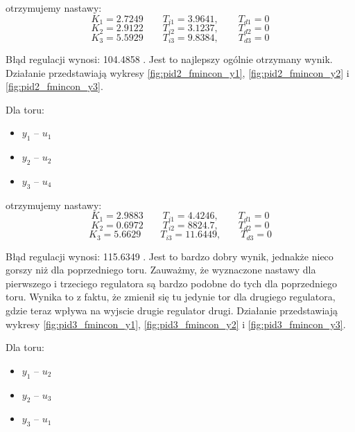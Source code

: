 otrzymujemy nastawy:
\begin{equation}
  K_1 = \num{2.7249} \qquad T_{i1} = \num{3.9641}, \qquad T_{d1} = 0 \nonumber
\end{equation}
\begin{equation}
  K_2 = \num{2.9122} \qquad T_{i2} = \num{3.1237}, \qquad T_{d2} = 0
\end{equation}
\begin{equation}
  K_3 = \num{5.5929} \qquad T_{i3} = \num{9.8384}, \qquad T_{d3} = 0 \nonumber
\end{equation}

Błąd regulacji wynosi: \num{104.4858} . Jest to najlepszy ogólnie otrzymany wynik.
Działanie
przedstawiają wykresy \ref{fig:pid2_fmincon_y1}, \ref{fig:pid2_fmincon_y2} i \ref{fig:pid2_fmincon_y3}.

Dla toru:
\begin{itemize}
  \item $y_1$ -- $u_1$
 \item $y_2$ -- $u_2$
 \item $y_3$ -- $u_4$
\end{itemize}

otrzymujemy nastawy:
\begin{equation}
  K_1 = \num{2.9883} \qquad T_{i1} = \num{4.4246}, \qquad T_{d1} = 0 \nonumber
\end{equation}
\begin{equation}
  K_2 = \num{0.6972} \qquad T_{i2} = \num{8824.7}, \qquad T_{d2} = 0
\end{equation}
\begin{equation}
  K_3 = \num{5.6629} \qquad T_{i3} = \num{11.6449}, \qquad T_{d3} = 0 \nonumber
\end{equation}

Błąd regulacji wynosi: \num{115.6349} .
Jest to bardzo dobry wynik, jednakże nieco gorszy niż dla poprzedniego toru.
Zauważmy, że wyznaczone nastawy dla pierwszego i trzeciego regulatora są bardzo podobne do tych dla poprzedniego toru.
Wynika to z faktu, że zmienił się tu jedynie tor dla drugiego regulatora, gdzie teraz wpływa na wyjscie drugie regulator drugi.
Działanie
przedstawiają wykresy \ref{fig:pid3_fmincon_y1}, \ref{fig:pid3_fmincon_y2} i \ref{fig:pid3_fmincon_y3}.

Dla toru:
\begin{itemize}
  \item $y_1$ -- $u_2$
 \item $y_2$ -- $u_3$
 \item $y_3$ -- $u_1$
\end{itemize}

